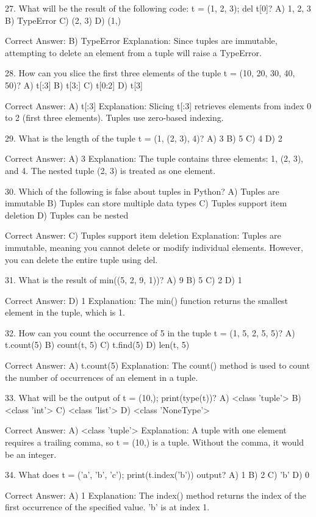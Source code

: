 27. What will be the result of the following code: t = (1, 2, 3); del t[0]?
A) 1, 2, 3
B) TypeError
C) (2, 3)
D) (1,)

Correct Answer: B) TypeError
Explanation: Since tuples are immutable, attempting to delete an element from a tuple will raise a TypeError.

28. How can you slice the first three elements of the tuple t = (10, 20, 30, 40, 50)?
A) t[:3]
B) t[3:]
C) t[0:2]
D) t[3]

Correct Answer: A) t[:3]
Explanation: Slicing t[:3] retrieves elements from index 0 to 2 (first three elements). Tuples use zero-based indexing.

29. What is the length of the tuple t = (1, (2, 3), 4)?
A) 3
B) 5
C) 4
D) 2

Correct Answer: A) 3
Explanation: The tuple contains three elements: 1, (2, 3), and 4. The nested tuple (2, 3) is treated as one element.

30. Which of the following is false about tuples in Python?
A) Tuples are immutable
B) Tuples can store multiple data types
C) Tuples support item deletion
D) Tuples can be nested

Correct Answer: C) Tuples support item deletion
Explanation: Tuples are immutable, meaning you cannot delete or modify individual elements. However, you can delete the entire tuple using del.

31. What is the result of min((5, 2, 9, 1))?
A) 9
B) 5
C) 2
D) 1

Correct Answer: D) 1
Explanation: The min() function returns the smallest element in the tuple, which is 1.

32. How can you count the occurrence of 5 in the tuple t = (1, 5, 2, 5, 5)?
A) t.count(5)
B) count(t, 5)
C) t.find(5)
D) len(t, 5)

Correct Answer: A) t.count(5)
Explanation: The count() method is used to count the number of occurrences of an element in a tuple.

33. What will be the output of t = (10,); print(type(t))?
A) <class 'tuple'>
B) <class 'int'>
C) <class 'list'>
D) <class 'NoneType'>

Correct Answer: A) <class 'tuple'>
Explanation: A tuple with one element requires a trailing comma, so t = (10,) is a tuple. Without the comma, it would be an integer.

34. What does t = ('a', 'b', 'c'); print(t.index('b')) output?
A) 1
B) 2
C) 'b'
D) 0

Correct Answer: A) 1
Explanation: The index() method returns the index of the first occurrence of the specified value. 'b' is at index 1.

